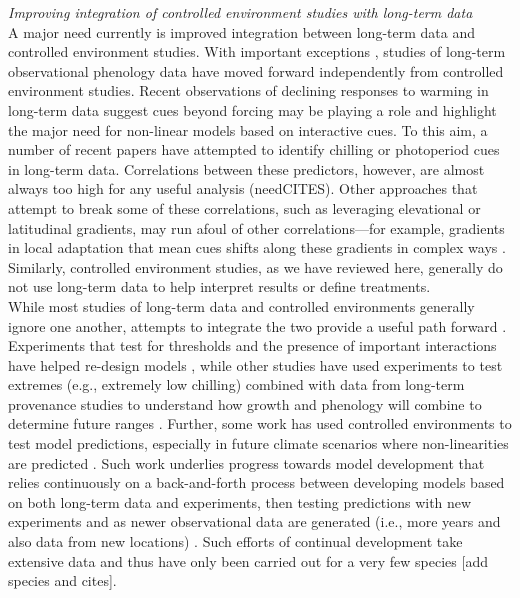 \documentclass[11pt,letter]{article}
\begin{document}
\emph{Improving integration of controlled environment studies with long-term data}\\
A major need currently is improved integration between long-term data and controlled environment studies. With important exceptions \citep{gauzere2017}, studies of long-term observational phenology data have moved forward independently from controlled environment studies. Recent observations of declining responses to warming in long-term data suggest cues beyond forcing may be playing a role \citep{fu2015} and highlight the major need for non-linear models based on interactive cues. To this aim, a number of recent papers have attempted to identify chilling or photoperiod cues in long-term data. Correlations between these predictors, however, are almost always too high for any useful analysis (needCITES). Other approaches that attempt to break some of these correlations, such as leveraging elevational or latitudinal gradients, may run afoul of other correlations---for example, gradients in local adaptation that mean cues shifts along these gradients in complex ways \citep{tansey2017}. Similarly, controlled environment studies, as we have reviewed here, generally do not use long-term data to help interpret results or define treatments. \\

While most studies of long-term data and controlled environments generally ignore one another, attempts to integrate the two provide a useful path forward \citep{Caffarra:2011qf,nagano2012,satake2013,ford2016,chuinearees}. Experiments that test for thresholds and the presence of important interactions have helped re-design models \citep{Caffarra:2011qf,chuinearees}, while other studies have used experiments to test extremes (e.g., extremely low chilling) combined with data from long-term provenance studies to understand how growth and phenology will combine to determine future ranges \citep{ford2016}. Further, some work has used controlled environments to test model predictions, especially in future climate scenarios where non-linearities are predicted \citep[see][]{nagano2012}. Such work underlies progress towards model development that relies continuously on a back-and-forth process between developing models based on both long-term data and experiments, then testing predictions with new experiments and as newer observational data are generated (i.e., more years and also data from new locations) \citep{nagano2012,satake2013}. Such efforts of continual development take extensive data and thus have only been carried out for a very few species [add species and cites].\\
\end{document}
